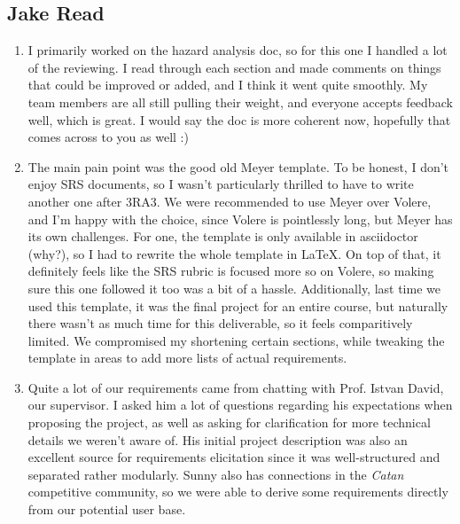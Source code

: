 \documentclass{article}
\begin{document}
\subsection*{Jake Read}\label{subsec:jake-read}
\begin{enumerate}
    \item I primarily worked on the hazard analysis doc, so for this one I handled a lot of the reviewing.
    I read through each section and made comments on things that could be improved or added, and I think it went quite smoothly.
    My team members are all still pulling their weight, and everyone accepts feedback well, which is great.
    I would say the doc is more coherent now, hopefully that comes across to you as well :)

    \item The main pain point was the good old Meyer template.
    To be honest, I don't enjoy SRS documents, so I wasn't particularly thrilled to have to write another one after 3RA3.
    We were recommended to use Meyer over Volere, and I'm happy with the choice, since Volere is pointlessly long, but Meyer has its own challenges.
    For one, the template is only available in asciidoctor (why?), so I had to rewrite the whole template in LaTeX\@.
    On top of that, it definitely feels like the SRS rubric is focused more so on Volere, so making sure this one followed it too was a bit of a hassle.
    Additionally, last time we used this template, it was the final project for an entire course, but naturally there wasn't as much time for this deliverable, so it feels comparitively limited.
    We compromised my shortening certain sections, while tweaking the template in areas to add more lists of actual requirements.

    \item Quite a lot of our requirements came from chatting with Prof. Istvan David, our supervisor.
    I asked him a lot of questions regarding his expectations when proposing the project, as well as asking for clarification for more technical details we weren't aware of.
    His initial project description was also an excellent source for requirements elicitation since it was well-structured and separated rather modularly.
    Sunny also has connections in the \emph{Catan} competitive community, so we were able to derive some requirements directly from our potential user base.


\end{enumerate}
\end{document}

